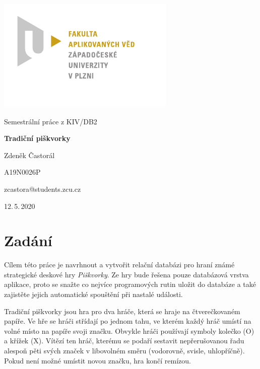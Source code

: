 \documentclass[
11pt,
a4paper,
pdftex,
czech,
titlepage
]{report}
\begin{document}
\begin{titlepage}
	{\centering\includegraphics[scale=1.2]{img/logo-FAV.pdf}\par}
	\centering
	\vspace*{2.5cm}
	{\Large Semestrální práce z KIV/DB2\par}
	\vspace{1.5cm}
	{\Huge\bfseries Tradiční piškvorky\par}
	\vspace{2.5cm}

	{\Large Zdeněk Častorál\par}
	{\Large A19N0026P\par}
	{\Large zcastora@students.zcu.cz\par}

	\vfill

	{\Large 12.\,5.\,2020}
\end{titlepage}

\tableofcontents
\thispagestyle{empty}
\clearpage

\newpage
\chapter{Zadání}\label{zadani}
\setcounter{page}{3}
Cílem této práce je navrhnout a vytvořit relační databázi pro hraní známé strategické deskové hry \textit{Piškvorky}. Ze hry bude řešena pouze databázová vrstva aplikace, proto se snažte co nejvíce programových rutin uložit do databáze a také zajistěte jejich automatické spouštění při nastalé události.

Tradiční piškvorky jsou hra pro dva hráče, která se hraje na čtverečkovaném papíře. Ve hře se hráči střídají po jednom tahu, ve kterém každý hráč umístí na volné místo na papíře svoji značku. Obvykle hráči používají symboly kolečko (O) a křížek (X). Vítězí ten hráč, kterému se podaří sestavit nepřerušovanou řadu alespoň pěti svých značek v libovolném směru (vodorovně, svisle, uhlopříčně). Pokud není možné umístit novou značku, hra končí remízou.
\end{document}
